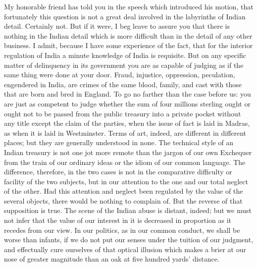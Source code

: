My honorable friend has told you in the speech which introduced his motion, that fortunately this question is not a great deal involved in the labyrinths of Indian detail. Certainly not. But if it were, I beg leave to assure you that there is nothing in the Indian detail which is more difficult than in the detail of any other business. I admit, because I have some experience of the fact, that for the interior regulation of India a minute knowledge of India is requisite. But on any specific matter of delinquency in its government you are as capable of judging as if the same thing were done at your door. Fraud, injustice, oppression, peculation, engendered in India, are crimes of the same blood, family, and cast with those that are born and bred in England. To go no farther than the case before us: you are just as competent to judge whether the sum of four millions sterling ought or ought not to be passed from the public treasury into a private pocket without any title except the claim of the parties, when the issue of fact is laid in Madras, as when it is laid in Westminster. Terms of art, indeed, are different in different places; but they are generally understood in none. The technical style of an Indian treasury is not one jot more remote than the jargon of our own Exchequer from the train of our ordinary ideas or the idiom of our common language. The difference, therefore, in the two cases is not in the comparative difficulty or facility of the two subjects, but in our attention to the one and our total neglect of the other. Had this attention and neglect been regulated by the value of the several objects, there would be nothing to complain of. But the reverse of that supposition is true. The scene of the Indian abuse is distant, indeed; but we must not infer that the value of our interest in it is decreased in proportion as it recedes from our view. In our politics, as in our common conduct, we shall be worse than infants, if we do not put our senses under the tuition of our judgment, and effectually cure ourselves of that optical illusion which makes a brier at our nose of greater magnitude than an oak at five hundred yards' distance.

